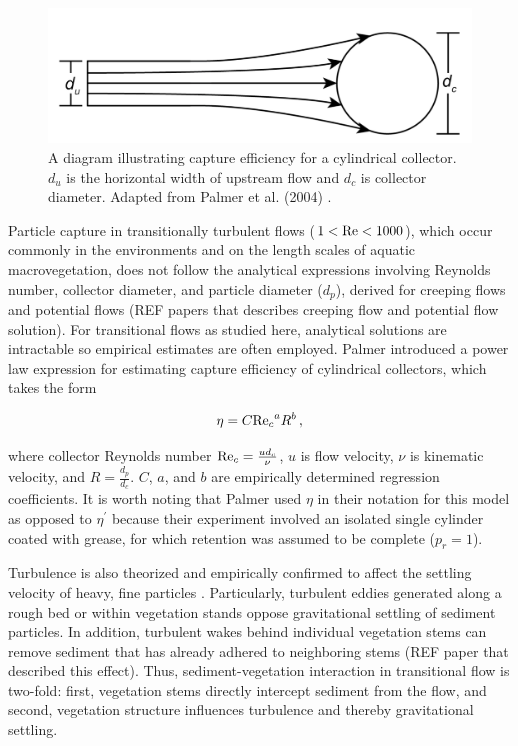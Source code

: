 \documentclass[geosciences,article,submit,moreauthors,pdftex]{Definitions/mdpi}
\begin{document}
\begin{figure}[H]
\includegraphics[width=5in]{../pics/collectorefficiency.png}
\centering
\caption{A diagram illustrating capture efficiency for a cylindrical collector. $d_u$ is the horizontal width of upstream flow and $d_c$ is collector diameter. Adapted from Palmer et al. (2004) \cite{Palmer_2004}.}
\label{fig:capeff}
\end{figure}

Particle capture in transitionally turbulent flows ($1<\mathrm{Re}<1000$), which occur commonly in the environments and on the length scales of aquatic macrovegetation, does not follow the analytical expressions involving Reynolds number, collector diameter, and particle diameter ($d_p$), derived for creeping flows and potential flows (REF papers that describes creeping flow and potential flow solution). For transitional flows as studied here, analytical solutions are intractable so empirical estimates are often employed. Palmer \cite{Palmer_2004} introduced a power law expression for estimating capture efficiency of cylindrical collectors, which takes the form 

\begin{equation}
    \eta=C{\mathrm{Re}_c}^{a}R^{b}\,,
    \label{eq:powerlaw}
\end{equation}

\noindent where collector Reynolds number $\mathrm{Re}_c=\frac{ud_c}{\nu}$, $u$ is flow velocity, $\nu$ is kinematic velocity, and $R=\frac{d_p}{d_c}$. $C$, $a$, and $b$ are empirically determined regression coefficients. It is worth noting that Palmer \cite{Palmer_2004} used $\eta$ in their notation for this model as opposed to $\eta^\prime$ because their experiment involved an isolated single cylinder coated with grease, for which retention was assumed to be complete ($p_r = 1$).

Turbulence is also theorized and empirically confirmed to affect the settling velocity of heavy, fine particles \citep{Nielsen_1993, Jacobs_2016, Wang_2018}. Particularly, turbulent eddies generated along a rough bed or within vegetation stands oppose gravitational settling of sediment particles. In addition, turbulent wakes behind individual vegetation stems can remove sediment that has already adhered to neighboring stems (REF paper that described this effect). Thus, sediment-vegetation interaction in transitional flow is two-fold: first, vegetation stems directly intercept sediment from the flow, and second, vegetation structure influences turbulence and thereby gravitational settling.
\end{document}
